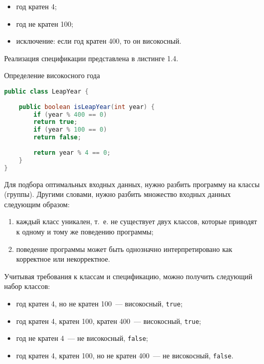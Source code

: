 \begin{itemize}
	\item год кратен 4;
	\item год не кратен 100;
	\item исключение: если год кратен 400, то он високосный.
\end{itemize}

Реализация спецификации представлена в листинге 1.4.

\begin{ListingEnv}[!h]%
	\captiondelim{ } %
	\caption{Определение високосного года}
	\begin{lstlisting}[language={Java}]
public class LeapYear {
	
	public boolean isLeapYear(int year) {
		if (year % 400 == 0)
		return true;
		if (year % 100 == 0)
		return false;
		
		return year % 4 == 0;
	}
}
	\end{lstlisting}
\end{ListingEnv}%

 Для подбора оптимальных входных данных, нужно разбить программу на классы (группы). Другими словами, нужно разбить множество входных данных следующим образом:
 
 \begin{enumerate}
 	\item каждый класс уникален, т.~е. не существует двух классов, которые приводят к одному и тому же поведению программы;
 	\item поведение программы может быть однозначно интерпретировано как корректное или некорректное.
 \end{enumerate}

Учитывая требования к классам и спецификацию, можно получить следующий набор классов:

 \begin{itemize}
 	\item год кратен 4, но не кратен 100~--- високосный, \texttt{true};
 	\item год кратен 4, кратен 100, кратен 400~--- високосный, \texttt{true};
 	\item год не кратен 4~--- не високосный, \texttt{false};
 	\item год кратен 4, кратен 100, но не кратен 400~--- не високосный, \texttt{false}.
 \end{itemize}

